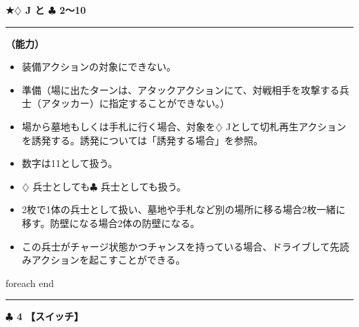 \documentclass[twocolumn,a5paper,papersize,10pt]{jarticle}
\begin{document}
\vspace{2mm}
\begin{tcolorbox}[title={\small\bf【Character】策士}{\scriptsize （兵士）}]

  {\scriptsize\bf ★{\normalsize $\diamondsuit$} J と {\normalsize $\clubsuit$} 2〜10}

\vspace{1mm} %
\hrule height 0.1mm depth 0mm width 62mm %
\vspace{1mm} %

{\bf（能力）}


\vspace{-1zh}%
\begin{itemize}
\setlength{\leftskip}{-0.3cm}
\setlength{\parskip}{0pt} %

\item 装備アクションの対象にできない。

\item 準備（場に出たターンは、アタックアクションにて、対戦相手を攻撃する兵士（アタッカー）に指定することができない。）

\item 場から墓地もしくは手札に行く場合、対象を{\normalsize $\diamondsuit$} Jとして切札再生アクションを誘発する。誘発については「誘発する場合」を参照。

\item 数字は11として扱う。

\item {\normalsize $\diamondsuit$} 兵士としても{\normalsize $\clubsuit$} 兵士としても扱う。

\item 2枚で1体の兵士として扱い、墓地や手札など別の場所に移る場合2枚一緒に移す。防壁になる場合2体の防壁になる。

\item この兵士がチャージ状態かつチャンスを持っている場合、ドライブして先読みアクションを起こすことができる。
\vspace{-1zh}%
\end{itemize}

\vspace{1mm} %
\end{tcolorbox}

\vspace{-1zh}
 foreach end
 

\vspace{3mm} %
\hrule height 0.5mm depth 0mm width 66.5mm %
\vspace{1mm} %
{\Large\bf $\clubsuit$ 4} {\normalsize\bf【スイッチ】} %
\vspace{1mm} %
\end{document}
